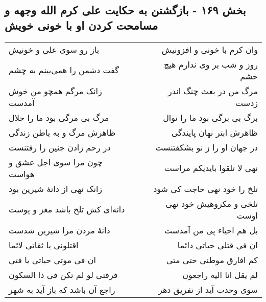 \begin{center}
\section*{بخش ۱۶۹ - بازگشتن به حکایت علی کرم الله وجهه و مسامحت کردن او با خونی خویش}
\label{sec:sh169}
\begin{longtable}{l p{0.5cm} r}
باز رو سوی علی و خونیش
&&
وان کرم با خونی و افزونیش
\\
گفت دشمن را همی‌بینم به چشم
&&
روز و شب بر وی ندارم هیچ خشم
\\
زانک مرگم همچو من خوش آمدست
&&
مرگ من در بعث چنگ اندر زدست
\\
مرگ بی مرگی بود ما را حلال
&&
برگ بی برگی بود ما را نوال
\\
ظاهرش مرگ و به باطن زندگی
&&
ظاهرش ابتر نهان پایندگی
\\
در رحم زادن جنین را رفتنست
&&
در جهان او را ز نو بشکفتنست
\\
چون مرا سوی اجل عشق و هواست
&&
نهی لا تلقوا بایدیکم مراست
\\
زانک نهی از دانهٔ شیرین بود
&&
تلخ را خود نهی حاجت کی شود
\\
دانه‌ای کش تلخ باشد مغز و پوست
&&
تلخی و مکروهیش خود نهی اوست
\\
دانهٔ مردن مرا شیرین شدست
&&
بل هم احیاء پی من آمدست
\\
اقتلونی یا ثقاتی لائما
&&
ان فی قتلی حیاتی دائما
\\
ان فی موتی حیاتی یا فتی
&&
کم افارق موطنی حتی متی
\\
فرقتی لو لم تکن فی ذا السکون
&&
لم یقل انا الیه راجعون
\\
راجع آن باشد که باز آید به شهر
&&
سوی وحدت آید از تفریق دهر
\\
\end{longtable}
\end{center}
